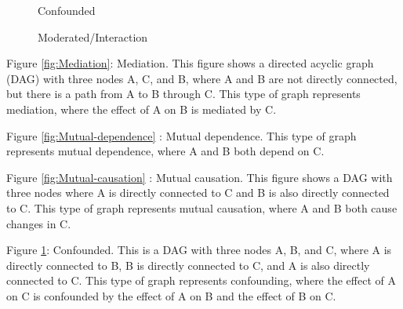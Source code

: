 \documentclass[twocolumn]{article} %
\begin{document}
\vspace{5mm}

\begin{figure}[!h]
    \centering
    \caption{Confounded}
    \label{fig:Confounded}
\end{figure}


\begin{figure}[!h]
    \centering
    \caption{Moderated/Interaction}
    \label{fig:Moderated}
\end{figure}


Figure \ref{fig:Mediation}: Mediation. This figure shows a directed acyclic graph (DAG) with three nodes A, C, and B, where A and B are not directly connected, but there is a path from A to B through C. This type of graph represents mediation, where the effect of A on B is mediated by C.

Figure \ref{fig:Mutual-dependence} : Mutual dependence. This type of graph represents mutual dependence, where A and B both depend on C.

Figure \ref{fig:Mutual-causation} : Mutual causation. This figure shows a DAG with three nodes where A is directly connected to C and B is also directly connected to C. This type of graph represents mutual causation, where A and B both cause changes in C.

Figure \ref{fig:Confounded}: Confounded. This is a DAG with three nodes A, B, and C, where A is directly connected to B, B is directly connected to C, and A is also directly connected to C. This type of graph represents confounding, where the effect of A on C is confounded by the effect of A on B and the effect of B on C.
\end{document}
